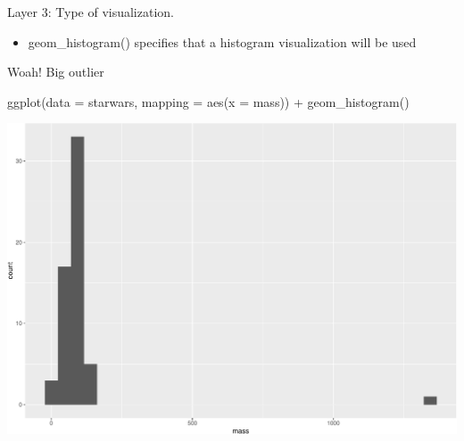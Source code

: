 \documentclass[
  ignorenonframetext,
]{beamer}
\newenvironment{Shaded}{\begin{snugshade}}{\end{snugshade}}
\newcommand{\AttributeTok}[1]{\textcolor[rgb]{0.40,0.45,0.13}{#1}}
\newcommand{\FunctionTok}[1]{\textcolor[rgb]{0.28,0.35,0.67}{#1}}
\newcommand{\NormalTok}[1]{\textcolor[rgb]{0.00,0.23,0.31}{#1}}
\newcommand{\SpecialCharTok}[1]{\textcolor[rgb]{0.37,0.37,0.37}{#1}}
\providecommand{\tightlist}{%
  \setlength{\itemsep}{0pt}\setlength{\parskip}{0pt}}\usepackage{longtable,booktabs,array}
\begin{document}
\begin{frame}[fragile]
Layer 3: Type of visualization.

\begin{itemize}
\tightlist
\item
  geom\_histogram() specifies that a histogram visualization will be
  used
\end{itemize}

Woah! Big outlier

\begin{Shaded}
\begin{Highlighting}[]
\FunctionTok{ggplot}\NormalTok{(}\AttributeTok{data =}\NormalTok{ starwars, }\AttributeTok{mapping =} \FunctionTok{aes}\NormalTok{(}\AttributeTok{x =}\NormalTok{ mass)) }\SpecialCharTok{+} \FunctionTok{geom\_histogram}\NormalTok{()}
\end{Highlighting}
\end{Shaded}

\includegraphics{GQ_DataViz_Day1_files/figure-beamer/unnamed-chunk-9-1.pdf}
\end{frame}
\end{document}
